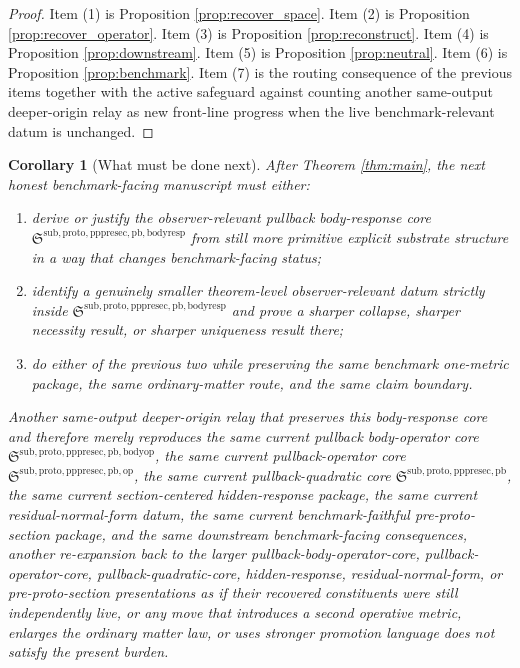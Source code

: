 \documentclass[11pt]{article}
\newcommand{\PrePreProtoSectionPullbackCore}{\mathfrak S^{\mathrm{sub,proto,pppresec,pb}}}
\newcommand{\PullbackOperatorCore}{\mathfrak S^{\mathrm{sub,proto,pppresec,pb,op}}}
\newcommand{\PullbackBodyOperatorCore}{\mathfrak S^{\mathrm{sub,proto,pppresec,pb,bodyop}}}
\newcommand{\PullbackBodyResponseCore}{\mathfrak S^{\mathrm{sub,proto,pppresec,pb,bodyresp}}}
\newtheorem{corollary}{Corollary}
\begin{document}
\begin{proof}
Item (1) is Proposition \ref{prop:recover_space}. Item (2) is Proposition \ref{prop:recover_operator}. Item (3) is Proposition \ref{prop:reconstruct}. Item (4) is Proposition \ref{prop:downstream}. Item (5) is Proposition \ref{prop:neutral}. Item (6) is Proposition \ref{prop:benchmark}. Item (7) is the routing consequence of the previous items together with the active safeguard against counting another same-output deeper-origin relay as new front-line progress when the live benchmark-relevant datum is unchanged.
\end{proof}

\begin{corollary}[What must be done next]
\label{cor:next}
After Theorem \ref{thm:main}, the next honest benchmark-facing manuscript must either:
\begin{enumerate}
    \item derive or justify the observer-relevant pullback body-response core \(\PullbackBodyResponseCore\) from still more primitive explicit substrate structure in a way that changes benchmark-facing status;
    \item identify a genuinely smaller theorem-level observer-relevant datum strictly inside \(\PullbackBodyResponseCore\) and prove a sharper collapse, sharper necessity result, or sharper uniqueness result there;
    \item do either of the previous two while preserving the same benchmark one-metric package, the same ordinary-matter route, and the same claim boundary.
\end{enumerate}
Another same-output deeper-origin relay that preserves this body-response core and therefore merely reproduces the same current pullback body-operator core \(\PullbackBodyOperatorCore\), the same current pullback-operator core \(\PullbackOperatorCore\), the same current pullback-quadratic core \(\PrePreProtoSectionPullbackCore\), the same current section-centered hidden-response package, the same current residual-normal-form datum, the same current benchmark-faithful pre-proto-section package, and the same downstream benchmark-facing consequences, another re-expansion back to the larger pullback-body-operator-core, pullback-operator-core, pullback-quadratic-core, hidden-response, residual-normal-form, or pre-proto-section presentations as if their recovered constituents were still independently live, or any move that introduces a second operative metric, enlarges the ordinary matter law, or uses stronger promotion language does not satisfy the present burden.
\end{corollary}
\end{document}

